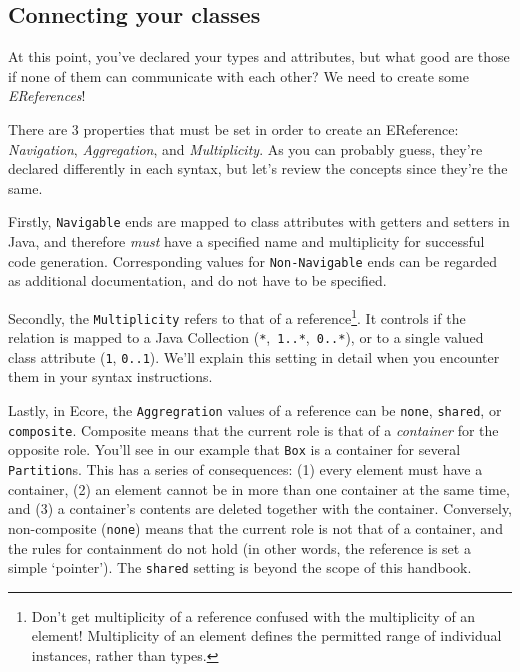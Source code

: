 \newpage
\subsection{Connecting your classes}
\genHeader
\hypertarget{static:references splash}{}

\texttt{}
\emph{}

At this point, you've declared your types and attributes, but what good are those if none of them can communicate with each other? We need to create some
\emph{EReferences}!

There are 3 properties that must be set in order to create an EReference: \emph{Navigation}, \emph{Aggregation}, and
\emph{Multiplicity}. As you can probably guess, they're declared differently in each syntax, but let's review the concepts since they're the same.

Firstly, \texttt{Navigable} ends are mapped to class attributes with getters and setters in Java, and therefore \emph{must} have a specified name and
multiplicity for successful code generation. Corresponding values for \texttt{Non-Navigable} ends can  be regarded as additional documentation, and do not have
to be specified.

Secondly, the \texttt{Multiplicity} refers to that of a reference\footnote{Don't get multiplicity of a reference confused with the multiplicity of an element!
Multiplicity of an element defines the permitted range of individual instances, rather than types.}. It controls if the relation is mapped to a
Java Collection (\texttt{*},~\texttt{1..*},~\texttt{0..*}), or to a single valued class attribute (\texttt{1}, \texttt{0..1}). We'll explain this setting in
detail when you encounter them in your syntax instructions.

Lastly, in Ecore, the \texttt{Aggregration} values of a reference can be \texttt{none}, \texttt{shared}, or \texttt{com\-po\-site}. Composite means that the
current role is that of a \emph{container} for the opposite role. You'll see in our example that \texttt{Box} is a container for several \texttt{Partition}s.
This has a series of consequences: (1) every element must have a container, (2) an element cannot be in more than one container at the same time, and (3) a
container's contents are deleted together with the container. Conversely, non-composite (\texttt{none}) means that the current role is not that of a container,
and the rules for containment do not hold (in other words, the reference is set a simple `pointer'). The \texttt{shared} setting is beyond the scope of this
handbook.





